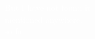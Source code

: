 \documentclass[preview,convert={density=600,outext=.png,command=\unexpanded{ {\convertexe\space -density \density\space\infile\space \ifx\size\empty\else -resize \size\fi\space -quality 90 -trim +repage -background "rgba(50,50,50,0.5)" -bordercolor "rgba(50,50,50,0.5)" -border 25 -flatten \outfile} } }]{standalone}
\begin{document}
\begin{center}
\textcolor{white}{ 
But I have not found it \\
mentioned anywhere, \\
so far \\ }
\end{center}
\end{document}
